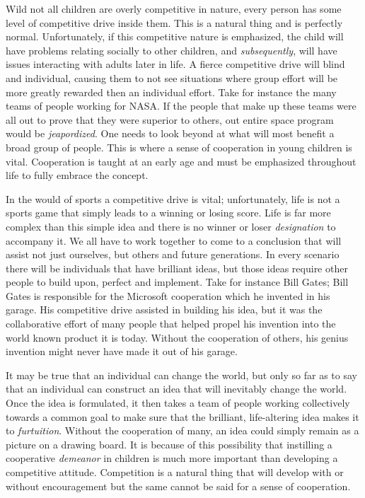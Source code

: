 Wild not all children are overly competitive in nature, every person has some level of competitive drive inside them.
This is a natural thing and is perfectly normal.
Unfortunately, if this competitive nature is emphasized, the child will have problems relating socially to other children, and \emph{subsequently}, will have issues interacting with adults later in life.
A fierce competitive drive will blind and individual, causing them to not see situations where group effort will be more greatly rewarded then an individual effort.
Take for instance the many teams of people working for NASA.
If the people that make up these teams were all out to prove that they were superior to others, out entire space program would be \emph{jeapordized}.
One needs to look beyond at what will most benefit a broad group of people.
This is where a sense of cooperation in young children is vital.
Cooperation is taught at an early age and must be emphasized throughout life to fully embrace the concept.

In the would of sports a competitive drive is vital; unfortunately, life is not a sports game that simply leads to a winning or losing score.
Life is far more complex than this simple idea and there is no winner or loser \emph{designation} to accompany it.
We all have to work together to come to a conclusion that will assist not just ourselves, but others and future generations.
In every scenario there will be individuals that have brilliant ideas, but those ideas require other people to build upon, perfect and implement.
Take for instance Bill Gates; Bill Gates is responsible for the Microsoft cooperation which he invented in his garage.
His competitive drive assisted in building his idea, but it was the collaborative effort of many people that helped propel his invention into the world known product it is today.
Without the cooperation of others, his genius invention might never have made it out of his garage.

It may be true that an individual can change the world, but only so far as to say that an individual can construct an idea that will inevitably change the world.
Once the idea is formulated, it then takes a team of people working collectively towards a common goal to make sure that the brilliant, life-altering idea makes it to \emph{furtuition}.
Without the cooperation of many, an idea could simply remain as a picture on a drawing board.
It is because of this possibility that instilling a cooperative \emph{demeanor} in children is much more important than developing a competitive attitude.
Competition is a natural thing that will develop with or without encouragement but the same cannot be said for a sense of cooperation.